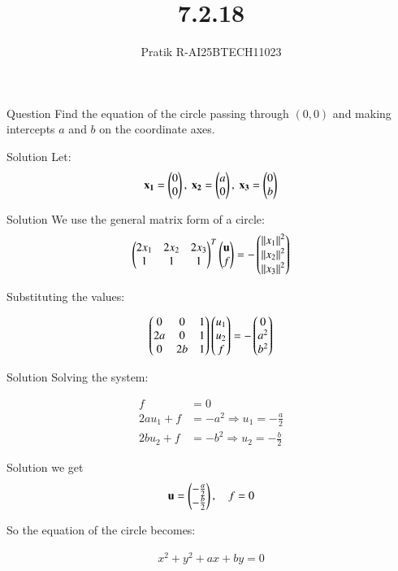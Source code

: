 \documentclass{beamer}
\title 
{7.2.18}
\author 
{Pratik R-AI25BTECH11023}
\begin{document}
\frame{\titlepage}
\begin{frame}{Question}
Find the equation of the circle passing through $(0, 0)$ and making intercepts $a$ and $b$ on the coordinate axes.
\end{frame}
\begin{frame}{Solution}
Let:
\begin{align}
\mathbf{x_1} = \begin{pmatrix}0 \\ 0\end{pmatrix},\ \mathbf{x_2} = \begin{pmatrix}a \\ 0\end{pmatrix},\ \mathbf{x_3} = \begin{pmatrix}0 \\ b\end{pmatrix}
\end{align}
\end{frame}
\begin{frame}{Solution}
We use the general matrix form of a circle:
\begin{align}
\begin{pmatrix}2x_1 & 2x_2 & 2x_3\\
1 & 1 & 1\end{pmatrix}^T \begin{pmatrix}\mathbf{u} \\ f\end{pmatrix} = - \begin{pmatrix}\left\lVert x_1\right\rVert^2 \\ \left\lVert x_2\right\rVert^2 \\ \left\lVert x_3\right\rVert^2\end{pmatrix}
\end{align}

Substituting the values:

\begin{align}
\begin{pmatrix}
0 & 0 & 1 \\
2a & 0 & 1 \\
0 & 2b & 1
\end{pmatrix}
\begin{pmatrix}
u_1 \\
u_2 \\
f
\end{pmatrix}
=
- \begin{pmatrix}
0 \\
a^2 \\
b^2
\end{pmatrix}
\end{align}
\end{frame}
\begin{frame}{Solution}
Solving the system:

\begin{align*}
f &= 0 \\
2a u_1 + f &= -a^2 \Rightarrow u_1 = -\frac{a}{2} \\
2b u_2 + f &= -b^2 \Rightarrow u_2 = -\frac{b}{2}
\end{align*}
\end{frame}
\begin{frame}{Solution}
we get
\begin{align}
\mathbf{u} = \begin{pmatrix} -\frac{a}{2} \\ -\frac{b}{2} \end{pmatrix}, \quad f = 0
\end{align}

So the equation of the circle becomes:


\begin{align}
x^2 + y^2 + ax + by = 0
\end{align}
\end{frame}
\end{document}
